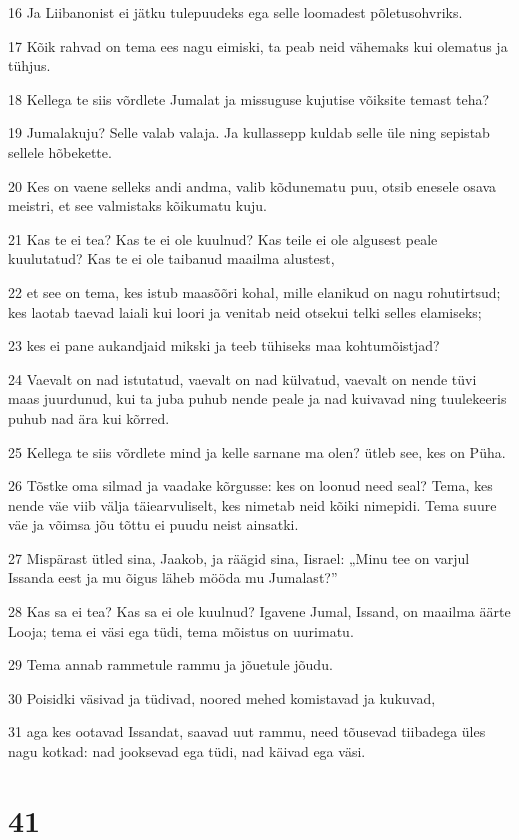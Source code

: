 \par 16 Ja Liibanonist ei jätku tulepuudeks ega selle loomadest põletusohvriks.
\par 17 Kõik rahvad on tema ees nagu eimiski, ta peab neid vähemaks kui olematus ja tühjus.
\par 18 Kellega te siis võrdlete Jumalat ja missuguse kujutise võiksite temast teha?
\par 19 Jumalakuju? Selle valab valaja. Ja kullassepp kuldab selle üle ning sepistab sellele hõbekette.
\par 20 Kes on vaene selleks andi andma, valib kõdunematu puu, otsib enesele osava meistri, et see valmistaks kõikumatu kuju.
\par 21 Kas te ei tea? Kas te ei ole kuulnud? Kas teile ei ole algusest peale kuulutatud? Kas te ei ole taibanud maailma alustest,
\par 22 et see on tema, kes istub maasõõri kohal, mille elanikud on nagu rohutirtsud; kes laotab taevad laiali kui loori ja venitab neid otsekui telki selles elamiseks;
\par 23 kes ei pane aukandjaid mikski ja teeb tühiseks maa kohtumõistjad?
\par 24 Vaevalt on nad istutatud, vaevalt on nad külvatud, vaevalt on nende tüvi maas juurdunud, kui ta juba puhub nende peale ja nad kuivavad ning tuulekeeris puhub nad ära kui kõrred.
\par 25 Kellega te siis võrdlete mind ja kelle sarnane ma olen? ütleb see, kes on Püha.
\par 26 Tõstke oma silmad ja vaadake kõrgusse: kes on loonud need seal? Tema, kes nende väe viib välja täiearvuliselt, kes nimetab neid kõiki nimepidi. Tema suure väe ja võimsa jõu tõttu ei puudu neist ainsatki.
\par 27 Mispärast ütled sina, Jaakob, ja räägid sina, Iisrael: „Minu tee on varjul Issanda eest ja mu õigus läheb mööda mu Jumalast?”
\par 28 Kas sa ei tea? Kas sa ei ole kuulnud? Igavene Jumal, Issand, on maailma äärte Looja; tema ei väsi ega tüdi, tema mõistus on uurimatu.
\par 29 Tema annab rammetule rammu ja jõuetule jõudu.
\par 30 Poisidki väsivad ja tüdivad, noored mehed komistavad ja kukuvad,
\par 31 aga kes ootavad Issandat, saavad uut rammu, need tõusevad tiibadega üles nagu kotkad: nad jooksevad ega tüdi, nad käivad ega väsi.

\chapter{41}


